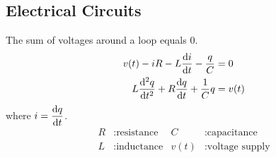 \documentclass{article}
\begin{document}
\begin{multicols}{3}
    \section*{Electrical Circuits}
    The sum of voltages around a loop equals 0.
    \begin{align*}
        v(t) - iR - L \dv{i}{t} - \frac{q}{C}      & = 0    \\
        L \dv[2]{q}{t} + R\dv{q}{t} + \frac{1}{C}q & = v(t)
    \end{align*}
    where $\displaystyle i = \dv{q}{t}$.
    \begin{align*}
        R & : \text{resistance} & C    & : \text{capacitance}    \\
        L & : \text{inductance} & v(t) & : \text{voltage supply}
    \end{align*}

\end{multicols}
\end{document}
